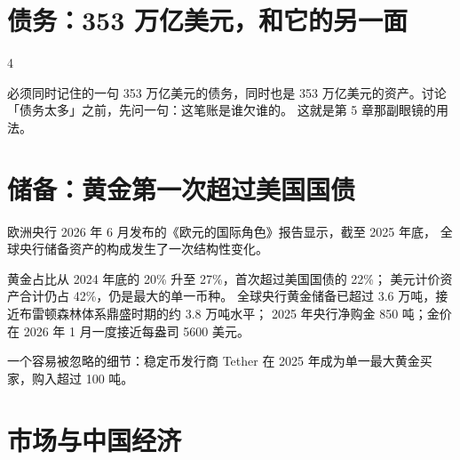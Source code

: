 \section{债务：353 万亿美元，和它的另一面}

\begin{statrow}{4}
\end{statrow}

\begin{databox}{必须同时记住的一句}
353 万亿美元的债务，同时也是 353 万亿美元的资产。讨论「债务太多」之前，先问一句：这笔账是谁欠谁的。
这就是第 5 章那副眼镜的用法。
\end{databox}

\section{储备：黄金第一次超过美国国债}

欧洲央行 2026 年 6 月发布的《欧元的国际角色》报告显示，截至 2025 年底，
全球央行储备资产的构成发生了一次结构性变化。

\begin{barfig}
\end{barfig}

黄金占比从 2024 年底的 20\% 升至 27\%，首次超过美国国债的 22\%；
美元计价资产合计仍占 42\%，仍是最大的单一币种。
全球央行黄金储备已超过 3.6 万吨，接近布雷顿森林体系鼎盛时期的约 3.8 万吨水平；
2025 年央行净购金 850 吨；金价在 2026 年 1 月一度接近每盎司 5600 美元。

一个容易被忽略的细节：稳定币发行商 Tether 在 2025 年成为单一最大黄金买家，购入超过 100 吨。

\section{市场与中国经济}

